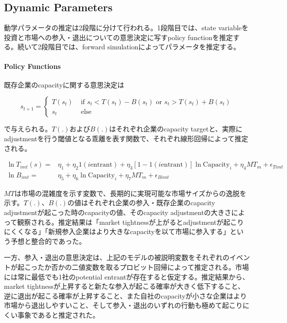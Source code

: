 \documentclass[11pt]{jsarticle}
\begin{document}
\subsection{Dynamic Parameters}

動学パラメータの推定は2段階に分けて行われる。1段階目では、state variableを投資と市場への参入・退出についての意思決定に写すpolicy functionを推定する。続いて2段階目では、forward simulationによってパラメータを推定する。

\paragraph{Policy Functions}

既存企業のcapacityに関する意思決定は

\[
s_{t+1} = \begin{cases}
  T(s_t) & \text{ if }s_t < T(s_t) - B(s_t) \text{ or } s_t > T(s_t) + B(s_t) \\
  s_t & \text{ else}
\end{cases}
\]

で与えられる。$T(.)$および$B(.)$はそれぞれ企業のcapacity targetと、実際にadjustmentを行う閾値となる乖離を表す関数で、それぞれ線形回帰によって推定される。

\begin{align*}
  \ln T_{imt}(s) =& \eta_1 + \eta_2 1 (i \text{entrant}) + \eta_3 [1 - 1 (i \text{entrant})] \ln \text{Capacity}_i + \eta_4 MT_m + \epsilon_{Timt} \\
  \ln B_{imt} = & \eta_5 + \eta_6 \ln \text{Capacity}_i + \eta_7 MT_m + \epsilon_{Bimt}
\end{align*}

$MT$は市場の混雑度を示す変数で、長期的に実現可能な市場サイズからの逸脱を示す。$T(.)$、$B(.)$の値はそれぞれ企業の参入・既存企業のcapacity adjustmentが起こった時のcapacityの値、そのcapacity adjustmentの大きさによって観察される。推定結果は「market tightnessが上がるとadjustmentが起こりにくくなる」「新規参入企業はより大きなcapacityを以て市場に参入する」という予想と整合的であった。

一方、参入・退出の意思決定は、上記のモデルの被説明変数をそれぞれのイベントが起こったか否かの二値変数を取るプロビット回帰によって推定される。市場には常に最低でも1社のpotential entrantが存在すると仮定する。推定結果から、market tightnessが上昇すると新たな参入が起こる確率が大きく低下すること、逆に退出が起こる確率が上昇すること、また自社のcapacityが小さな企業はより市場から退出しやすいこと、そして参入・退出のいずれの行動も極めて起こりにくい事象であると推定された。
\end{document}
